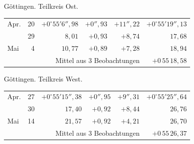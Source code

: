 \noindent\begin{minipage}[t]{.495\textwidth}\centering Göttingen. Teilkreis Ost.\par\smallskip
{\scriptsize\setlength{\tabcolsep}{1pt}\renewcommand{\arraystretch}{1.2}\begin{tabular}{lr|r|r|r|r|}
Apr.&20&$+0^\circ55'6''{,}98$&$+0''{,}93$&$+11''{,}22$&$+0^\circ55'19''{,}13$\\
&29&$8{,}01$&$+0{,}93$&$+8{,}74$&$17{,}68$\\
Mai&4&$10{,}77$&$+0{,}89$&$+7{,}28$&$18{,}94$\\
\cline{6-6}\multicolumn{5}{r}{Mittel aus 3 Beobachtungen}&$+0\,55\,18{,}58$
\end{tabular}}\end{minipage}\hfill\begin{minipage}[t]{.495\textwidth}\centering Göttingen. Teilkreis West.\par\smallskip
{\scriptsize\setlength{\tabcolsep}{1pt}\renewcommand{\arraystretch}{1.2}\begin{tabular}{lr|r|r|r|r}
Apr.&27&$+0^\circ55'15''{,}38$&$+0''{,}95$&$+9''{,}31$&$+0^\circ55'25''{,}64$\\
&30&$17{,}40$&$+0{,}92$&$+8{,}44$&$26{,}76$\\
Mai&14&$21{,}57$&$+0{,}92$&$+4{,}21$&$26{,}70$\\
\cline{6-6}\multicolumn{5}{r}{Mittel aus 3 Beobachtungen}&$+0\,55\,26{,}37$
\end{tabular}}\end{minipage}
\par\vspace{4mm}

